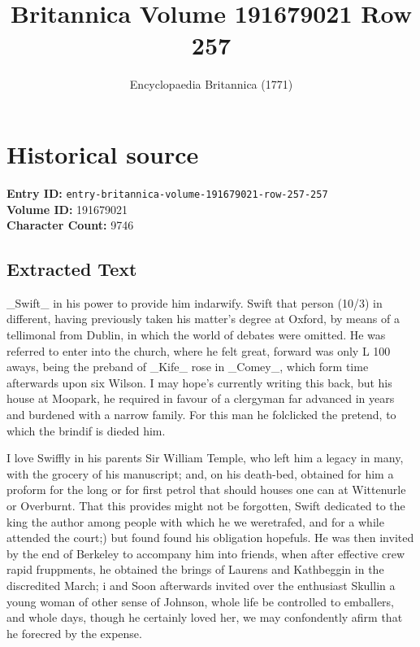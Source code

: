 \documentclass{article}
\title{Britannica Volume 191679021 Row 257}
\date{Encyclopaedia Britannica (1771)}
\begin{document}
\maketitle

\section*{Historical source}
\textbf{Entry ID:} \texttt{entry-britannica-volume-191679021-row-257-257} \\
\textbf{Volume ID:} 191679021 \\
\textbf{Character Count:} 9746

\subsection*{Extracted Text}
\_Swift\_ in his power to provide him indarwify. Swift that person (10/3) in different, having previously taken his matter’s degree at Oxford, by means of a tellimonal from Dublin, in which the world of debates were omitted. He was referred to enter into the church, where he felt great, forward was only L 100 aways, being the preband of \_Kife\_ rose in \_Comey\_, which form time afterwards upon six Wilson. I may hope’s currently writing this back, but his house at Moopark, he required in favour of a clergyman far advanced in years and burdened with a narrow family. For this man he folclicked the pretend, to which the brindif is dieded him.

I love Swiffly in his parents Sir William Temple, who left him a legacy in many, with the grocery of his manuscript; and, on his death-bed, obtained for him a proform for the long or for first petrol that should houses one can at Wittenurle or Overburnt. That this provides might not be forgotten, Swift dedicated to the king the author among people with which he we weretrafed, and for a while attended the court;) but found found his obligation hopefuls. He was then invited by the end of Berkeley to accompany him into friends, when after effective crew rapid fruppments, he obtained the brings of Laurens and Kathbeggin in the discredited March; i and Soon afterwards invited over the enthusiast Skullin a young woman of other sense of Johnson, whole life be controlled to emballers, and whole days, though he certainly loved her, we may confondently afirm that he forecred by the expense.
\end{document}
